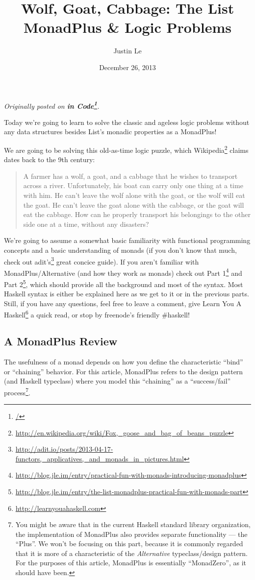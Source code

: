 \documentclass[]{article}
\title{Wolf, Goat, Cabbage: The List MonadPlus \& Logic Problems}
\author{Justin Le}
\date{December 26, 2013}
\renewcommand{\href}[2]{#2\footnote{\url{#1}}}
\begin{document}
\maketitle

\emph{Originally posted on \textbf{\href{/}{in Code}}.}

Today we're going to learn to solve the classic and ageless logic
problems without any data structures besides List's monadic properties
as a MonadPlus!

We are going to be solving this old-as-time logic puzzle, which
\href{http://en.wikipedia.org/wiki/Fox,_goose_and_bag_of_beans_puzzle}{Wikipedia}
claims dates back to the 9th century:

\begin{quote}
A farmer has a wolf, a goat, and a cabbage that he wishes to transport
across a river. Unfortunately, his boat can carry only one thing at a
time with him. He can't leave the wolf alone with the goat, or the wolf
will eat the goat. He can't leave the goat alone with the cabbage, or
the goat will eat the cabbage. How can he properly transport his
belongings to the other side one at a time, without any disasters?
\end{quote}

We're going to assume a somewhat basic familiarity with functional
programming concepts and a basic understanding of monads (if you don't
know that much, check out
\href{http://adit.io/posts/2013-04-17-functors,_applicatives,_and_monads_in_pictures.html}{adit's}
great concice guide). If you aren't familiar with MonadPlus/Alternative
(and how they work as monads) check out
\href{http://blog.jle.im/entry/practical-fun-with-monads-introducing-monadplus}{Part
1} and
\href{http://blog.jle.im/entry/the-list-monadplus-practical-fun-with-monads-part}{Part
2}, which should provide all the background and most of the syntax. Most
Haskell syntax is either be explained here as we get to it or in the
previous parts. Still, if you have any questions, feel free to leave a
comment, give \href{http://learnyouahaskell.com}{Learn You A Haskell} a
quick read, or stop by freenode's friendly \#haskell!

\subsection{A MonadPlus Review}\label{a-monadplus-review}

The usefulness of a monad depends on how you define the characteristic
``bind'' or ``chaining'' behavior. For this article, MonadPlus refers to
the design pattern (and Haskell typeclass) where you model this
``chaining'' as a ``success/fail'' process\footnote{You might be aware
  that in the current Haskell standard library organization, the
  implementation of MonadPlus also provides separate functionality ---
  the ``Plus''. We won't be focusing on this part, because it is
  commonly regarded that it is more of a characteristic of the
  \emph{Alternative} typeclass/design pattern. For the purposes of this
  article, MonadPlus is essentially ``MonadZero'', as it should have
  been.}.
\end{document}
